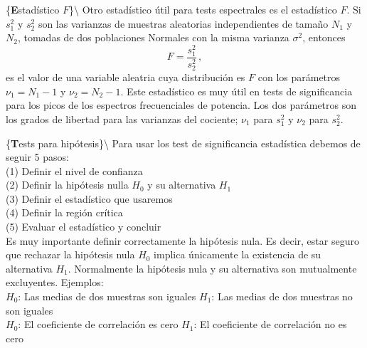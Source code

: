 \documentclass[
]{agujournal2019}
\begin{document}
\vspace{0.5cm}

\{\noindent \textbf Estadístico \(F\)\}\textbackslash{} Otro estadístico
útil para tests espectrales es el estadístico \(F\). Si \(s^2_1\) y
\(s^2_2\) son las varianzas de muestras aleatorias independientes de
tamaño \(N_1\) y \(N_2\), tomadas de dos poblaciones Normales con la
misma varianza \(\sigma^2\), entonces \[F=\frac{s^2_1}{s^2_2}\,,\] es el
valor de una variable aleatria cuya distribución es \(F\) con los
parámetros \(\nu_1=N_1-1\) y \(\nu_2=N_2-1\). Este estadístico es muy
útil en tests de significancia para los picos de los espectros
frecuenciales de potencia. Los dos parámetros son los grados de libertad
para las varianzas del cociente; \(\nu_1\) para \(s^2_1\) y \(\nu_2\)
para \(s^2_2\).

\vspace{0.5cm}

\{\noindent \textbf Tests para hipótesis\}\textbackslash{} Para usar los
test de significancia estadística debemos de seguir 5 pasos:\\
(1) Definir el nivel de confianza\\
(2) Definir la hipótesis nulla \(H_0\) y su alternativa \(H_1\)\\
(3) Definir el estadístico que usaremos\\
(4) Definir la región crítica\\
(5) Evaluar el estadístico y concluir\\

Es muy importante definir correctamente la hipótesis nula. Es decir,
estar seguro que rechazar la hipótesis nula \(H_0\) implica únicamente
la existencia de su alternativa \(H_1\). Normalmente la hipótesis nula y
su alternativa son mutualmente excluyentes. Ejemplos:\\

\(H_0\): Las medias de dos muestras son iguales \(H_1\): Las medias de
dos muestras no son iguales\\

\(H_0\): El coeficiente de correlación es cero \(H_1\): El coeficiente
de correlación no es cero\\

\vspace{0.5cm}
\end{document}
